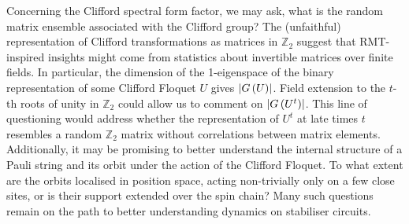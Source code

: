 \documentclass[10pt]{article}
\begin{document}
Concerning the Clifford spectral form factor, we may ask, what is the random matrix ensemble associated with the Clifford group? The (unfaithful) representation of Clifford transformations as matrices in $\mathbb{Z}_2$ suggest that RMT-inspired insights might come from statistics about invertible matrices over finite fields. In particular, the dimension of the 1-eigenspace of the binary representation of some Clifford Floquet $U$ gives $\abs{G\left(U\right)}$. Field extension to the $t$-th roots of unity in $\mathbb{Z}_2$ could allow us to comment on $\abs{G\left(U^t\right)}$. This line of questioning would address whether the representation of $U^t$ at late times $t$ resembles a random $\mathbb{Z}_2$ matrix without correlations between matrix elements. Additionally, it may be promising to better understand the internal structure of a Pauli string and its orbit under the action of the Clifford Floquet. To what extent are the orbits localised in position space, acting non-trivially only on a few close sites, or is their support extended over the spin chain? Many such questions remain on the path to better understanding dynamics on stabiliser circuits.






\end{document}
